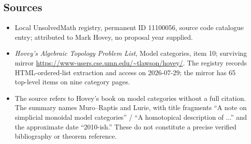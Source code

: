 \documentclass[11pt]{article}
\begin{document}
\subsection{Sources}
\begin{itemize}
\item Local UnsolvedMath registry, permanent ID 11100056, source code catalogue entry; attributed to Mark Hovey, no proposal year supplied.
\item \emph{Hovey's Algebraic Topology Problem List}, Model categories, item 10; surviving mirror \url{https://www-users.cse.umn.edu/~tlawson/hovey/}. The registry records HTML-ordered-list extraction and access on 2026-07-29; the mirror has 65 top-level items on nine category pages.
\item The source refers to Hovey's book on model categories without a full citation. The summary names Muro--Raptis and Lurie, with title fragments ``A note on simplicial monoidal model categories'' / ``A homotopical description of ...'' and the approximate date ``2010-ish.'' These do not constitute a precise verified bibliography or theorem reference.
\end{itemize}
\end{document}
